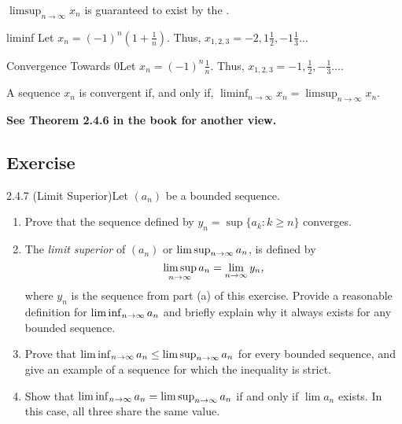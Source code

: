 \(\limsup_{n \to \infty} x_n\) is guaranteed to exist by the .

\begin{example}
    {liminf} Let \(x_n = (-1)^n(1 + \frac{1}{n})\). Thus, \(x_{1,2,3} = -2,1\frac{1}{2},-1\frac{1}{3}\dots\)
\end{example}

\begin{example}
    {Convergence Towards 0}Let \(x_n = (-1)^n\frac{1}{n}\). Thus, \(x_{1,2,3} = -1, \frac{1}{2}, -\frac{1}{3}\dots\).
\end{example}

\begin{theorem}
    A sequence \(x_n\) is convergent if, and only if, \(\liminf_{n \to \infty} x_n = \limsup_{n \to \infty} x_n\).
\end{theorem}

\textbf{See Theorem 2.4.6 in the book for another view.}


\renewcommand{\theenumi}{\alph{enumi}}
\renewcommand{\labelenumi}{(\theenumi)}
\subsection{Exercise}

\begin{exercise}
    {2.4.7 (Limit Superior)}Let \((a_{n})\) be a bounded sequence.
    \begin{enumerate}
        \item Prove that the sequence defined by \(y_{n} = \sup\{a_{k} \colon k \geq n\}\) converges.
        \item The \textit{limit superior} of \((a_{n})\) or \(\limsup_{n\rightarrow \infty}a_{n}\), is defined by \[
                  \limsup_{n\rightarrow \infty}a_{n} = \lim_{n \rightarrow \infty} y_{n},
              \]
              where \(y_{n}\) is the sequence from part (a) of this exercise. Provide a reasonable definition for \(\liminf_{n\rightarrow \infty}a_{n}\) and briefly explain why it always exists for any bounded sequence.
        \item Prove that \(\liminf_{n\rightarrow \infty}a_{n} \leq \limsup_{n\rightarrow \infty}a_{n}\) for every bounded sequence, and give an example of a sequence for which the inequality is strict.
        \item Show that \(\liminf_{n\rightarrow \infty}a_{n} = \limsup_{n\rightarrow \infty}a_{n}\) if and only if \(\lim a_{n}\) exists. In this case, all three share the same value.
    \end{enumerate}
\end{exercise}

